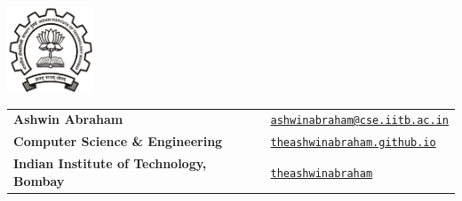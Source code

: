 \documentclass[11pt,letterpaper,sans]{moderncv}
\newif\iflong
\newcommand{\makefield}[2]{\makebox[1.5em]{\color{blue}#1} #2\hspace{2em}}
\begin{document}
\iflong
  \addtolength{\topmargin}{9.54mm}
\fi
\vspace*{1pt}

\setlength{\arrayrulewidth}{0.5mm}
\begin{minipage}{0.15\linewidth}
    \centering
    \includegraphics[height =1.0in]{iitb.png}
\end{minipage}
\begin{minipage}{0.65\linewidth}
    \setlength{\tabcolsep}{18pt}
    \def\arraystretch{1.15}
    \begin{tabular}{ll}
        \textbf{\Large{Ashwin Abraham}} & \makefield{\faEnvelope}{\href{mailto:ashwinabraham@cse.iitb.ac.in}{\texttt{ashwinabraham@cse.iitb.ac.in}}} \\
        \textbf{Computer Science \& Engineering} & \makefield{\faGlobe}{\href{https://theashwinabraham.github.io}{\texttt{theashwinabraham.github.io}}} \\
        \textbf{Indian Institute of Technology, Bombay} & \makefield{\faGithub}{\href{https://github.com/theashwinabraham}{\texttt{theashwinabraham}}}\\
    \end{tabular}
\end{minipage}\hfill

\end{document}

